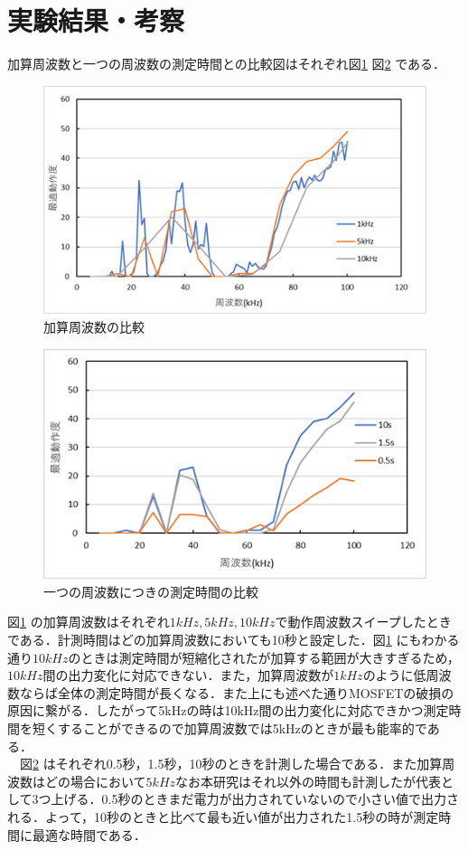\documentclass[10pt,a4paper,twocolumn]{jarticle}
\begin{document}
\section{実験結果・考察}
加算周波数と一つの周波数の測定時間との比較図はそれぞれ図\ref{fig:fre} 図\ref{fig:time} である．
\begin{figure}[h]
	\centering
	\includegraphics[scale=0.5]{hikakufre.png}
	\caption{加算周波数の比較}
	\label{fig:fre}
\end{figure}
\begin{figure}[h]
	\centering
	\includegraphics[scale=0.5]{hikakutime.png}
	\caption{一つの周波数につきの測定時間の比較}
	\label{fig:time}
\end{figure}
図\ref{fig:fre} の加算周波数はそれぞれ$1kHz,5kHz,10kHz$で動作周波数スイープしたときである．計測時間はどの加算周波数においても10秒と設定した．図\ref{fig:fre} にもわかる通り$10kHz$のときは測定時間が短縮化されたが加算する範囲が大きすぎるため，$10kHz$間の出力変化に対応できない．また，加算周波数が$1kHz$のように低周波数ならば全体の測定時間が長くなる．また上にも述べた通りMOSFETの破損の原因に繋がる．したがって5kHzの時は10kHz間の出力変化に対応できかつ測定時間を短くすることができるので加算周波数では5kHzのときが最も能率的である．\\　図\ref{fig:time} はそれぞれ0.5秒，1.5秒，10秒のときを計測した場合である．また加算周波数はどの場合において$5kHz$なお本研究はそれ以外の時間も計測したが代表として3つ上げる．0.5秒のときまだ電力が出力されていないので小さい値で出力される．よって，10秒のときと比べて最も近い値が出力された1.5秒の時が測定時間に最適な時間である．
\end{document}
